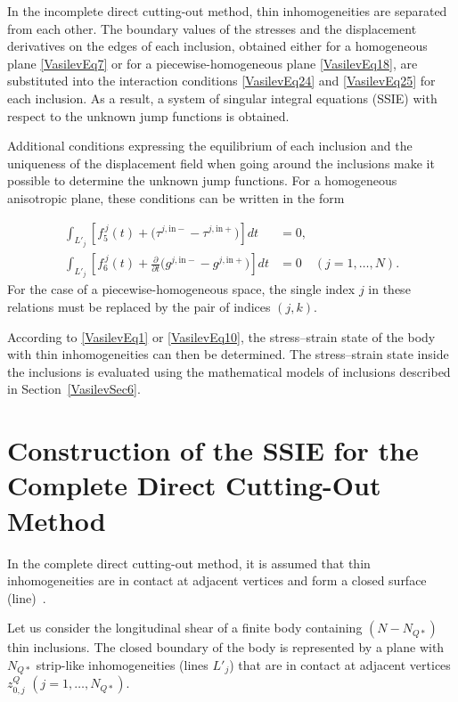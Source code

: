In the incomplete direct cutting-out method, thin inhomogeneities are separated from each other.
The boundary values of the stresses and the displacement derivatives on the edges of each inclusion,
obtained either for a homogeneous plane \eqref{VasilevEq7} or for a piecewise-homogeneous plane
\eqref{VasilevEq18}, are substituted into the interaction conditions
\eqref{VasilevEq24} and \eqref{VasilevEq25} for each inclusion.
As a result, a system of singular integral equations (SSIE) with respect to the unknown jump functions is obtained.

Additional conditions expressing the equilibrium of each inclusion and the uniqueness of the displacement field when going around the inclusions make it possible to determine the unknown jump functions.
For a homogeneous anisotropic plane, these conditions can be written in the form

\begin{equation*}
	\label{VasilevEq27}
	\begin{aligned}
	\int_{L'_j}
	\left[
	f_5^{\,j}(t)
	+
	\bigl(
	\tau^{j,\mathrm{in}-}
	-
	\tau^{j,\mathrm{in}+}
	\bigr)
	\right] dt
	&=0,
	\\
	\int_{L'_j}
	\left[
	f_6^{\,j}(t)
	+
	\frac{\partial}{\partial t}
	\bigl(
	g^{j,\mathrm{in}-}
	-
	g^{j,\mathrm{in}+}
	\bigr)
	\right] dt
	&=0
	\quad
	(j=1,\ldots,N).
	\end{aligned}
\end{equation*}
%
For the case of a piecewise-homogeneous space, the single index $j$ in these relations must be replaced by the pair of indices $(j,k)$.

According to \eqref{VasilevEq1} or \eqref{VasilevEq10}, the stress--strain state of the body with thin inhomogeneities can then be determined.
The stress--strain state inside the inclusions is evaluated using the mathematical models of inclusions described in Section~\ref{VasilevSec6}.

\section{Construction of the SSIE for the Complete Direct Cutting-Out Method}

In the complete direct cutting-out method, it is assumed that thin
inhomogeneities are in contact at adjacent vertices and form a closed
surface (line)~\cite{Vasilev16}.

Let us consider the longitudinal shear of a finite body containing
$(N-N_{Q*})$ thin inclusions. The closed boundary of the body is
represented by a plane with $N_{Q*}$ strip-like inhomogeneities
(lines $L'_j$) that are in contact at adjacent vertices
$z_{0,j}^{Q}$ $(j=1,\ldots,N_{Q*})$.

